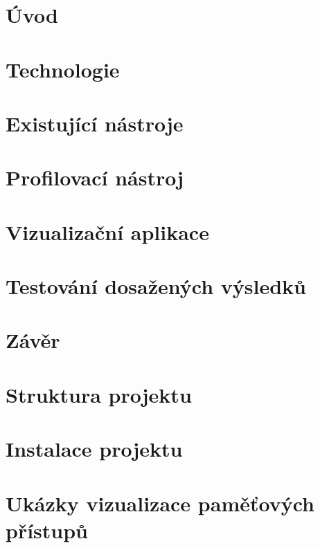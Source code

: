 \documentclass[czech,master,public,dept460,male,hidelinks,cpp]{diploma}
\begin{document}
\MakeTitlePages

\renewcommand\listingscaption{Výpis}
\renewcommand\listoflistingscaption{Seznam výpisů zdrojového kódu}
\listoflistings

\section{Úvod}


\section{Technologie}
\label{sec:technology}
    

\section{Existující nástroje}
\label{sec:stateoftheart}
    

\section{Profilovací nástroj}
\label{sec:profiler}
    

\section{Vizualizační aplikace}
\label{sec:visualisation}
    

\section{Testování dosažených výsledků}
\label{sec:benchmark}
    

\section{Závěr}
\label{sec:conclusion}
    

\printbibheading[title=Literatura, heading=bibintoc]
\printbibliography[heading=none]

\appendix

\section{Struktura projektu}
    
\section{Instalace projektu}
    
\section{Ukázky vizualizace paměťových přístupů}
    
\end{document}
